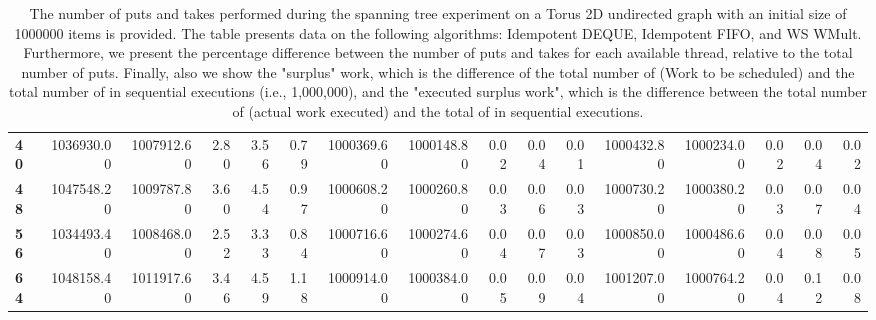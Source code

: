 \begin{table}[!ht]
{\begin{tabular}{lrrrrrrrrrrrrrrr}
\textbf{40} &       1036930.00 & 1007912.60 &           2.80 &        3.56 &                 0.79 &      1000369.60 & 1000148.80 &           0.02 &        0.04 &                 0.01 & 1000432.80 & 1000234.00 &           0.02 &        0.04 &                 0.02 \\
\textbf{48} &       1047548.20 & 1009787.80 &           3.60 &        4.54 &                 0.97 &      1000608.20 & 1000260.80 &           0.03 &        0.06 &                 0.03 & 1000730.20 & 1000380.20 &           0.03 &        0.07 &                 0.04 \\
\textbf{56} &       1034493.40 & 1008468.00 &           2.52 &        3.33 &                 0.84 &      1000716.60 & 1000274.60 &           0.04 &        0.07 &                 0.03 & 1000850.00 & 1000486.60 &           0.04 &        0.08 &                 0.05 \\
\textbf{64} &       1048158.40 & 1011917.60 &           3.46 &        4.59 &                 1.18 &      1000914.00 & 1000384.00 &           0.05 &        0.09 &                 0.04 & 1001207.00 & 1000764.20 &           0.04 &        0.12 &                 0.08 \\
\bottomrule
\end{tabular}}
\label{difference-Torus_2D_undirected-1000000-IDEMPOTENT_DEQUE-IDEMPOTENT_FIFO-WS_NC_MULT_OPT}
\caption{The number of puts and takes performed during the
    spanning tree experiment on a Torus 2D undirected graph with an initial size
    of 1000000 items is provided. The table presents data on the
    following algorithms: Idempotent DEQUE, Idempotent FIFO, and
    WS WMult. Furthermore, we present the percentage difference
    between the number of puts and takes for each available thread,
    relative to the total number of puts. Finally, also we show the
    "surplus" work, which is the difference of the total number of
    \Puts (Work to be scheduled) and the total number of \Puts in
    sequential executions (i.e., 1,000,000), and the "executed surplus
    work", which is the difference between the total number of \Takes
    (actual work executed) and the total of \Takes in sequential
    executions.}
\end{table}
